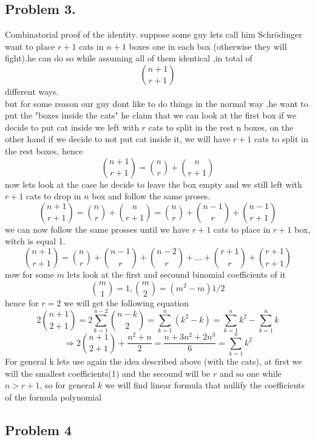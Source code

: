 \documentclass[12pt]{article}
\begin{document}
\subsection*{Problem 3.}
Combinatorial proof of the identity. suppose some guy  lets call him  Schrödinger want to place  $r+1$ cats in $n+1$
boxes one in each box (otherwise they will fight).he can do so while assuming all of them identical ,in total of  
\[ 
\binom{n+1}{r+1}
\]
different ways.\\but for some reason our guy dont like to do things in the normal way ,he want to put the "boxes inside the cats" he claim that we can look at the first box if we decide to put cat inside we left with $r$ cats to split in the rest n boxes, on the other hand  if we decide to not put cat inside it, we will have $r+1$ cats to split in the rest boxes, hence
\[ 
\binom{n+1}{r+1}=\binom{n}{r}+\binom{n}{r+1}
\]
now lets look at the case he decide to leave the box empty and we still left with $r+1$ cats to drop in $n$ box and follow the same
 proses.
 \[ 
\binom{n+1}{r+1}=\binom{n}{r}+\binom{n}{r+1}=\binom{n}{r}+\binom{n-1}{r}+\binom{n-1}{r+1}
\]
we can now follow the same prosses until we have $r+1$ cats to place in $r+1$ box, witch is equal 1.
 \[
 \binom{n+1}{r+1}=\binom{n}{r}+\binom{n-1}{r}+\binom{n-2}{r}+
 \dots +\binom{r+1}{r}+
 \binom{r+1}{r+1}
\]
now for some $m$ lets look at the first and secound binomial coefficients of it
 \[
 \binom{m}{1}=1,\binom{m}{2}=(m^2-m)1/2
\]
hence for $r=2$ we will get the following equation
 \[
 2\binom{n+1}{2+1}= 2\sum^{n-2}_{k=1} \binom{n-k}{2}=\sum^{n}_{k=1} (k^2-k)=\sum^{n}_{k=1} k^2-\sum^{n}_{k=1}k
 \]
 \[\Rightarrow
 2\binom{n+1}{2+1}+\dfrac{n^2+n}{2}=\dfrac{n+3n^2+2n^3}{6}=\sum^{n}_{k=1} k^2
  \]
  For general k lets use again the idea described above (with the cats), at first we will the smallest coefficients(1) and the secound will be $r$ and so one while $n>r+1$, so for general $k$ we will find linear formula that nullify the coefficients of the formula polynomial 
  \\ 
\subsection*{Problem 4}
\end{document}
